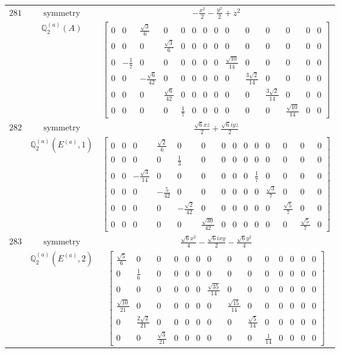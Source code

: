 \documentclass[fleqn,8pt,landscape]{jsarticle}
\begin{document}
\begin{longtable}{ccc}
$ 281 $ & $ \text{symmetry} $ & $ - \frac{x^{2}}{2} - \frac{y^{2}}{2} + z^{2} $ \\
$  $ & $ \mathbb{Q}_{2}^{(a)}(A) $ & $ \begin{bmatrix} 0 & 0 & \frac{\sqrt{3}}{6} & 0 & 0 & 0 & 0 & 0 & 0 & 0 & 0 & 0 & 0 & 0 \\ 0 & 0 & 0 & \frac{\sqrt{3}}{6} & 0 & 0 & 0 & 0 & 0 & 0 & 0 & 0 & 0 & 0 \\ 0 & - \frac{1}{7} & 0 & 0 & 0 & 0 & 0 & 0 & \frac{\sqrt{10}}{14} & 0 & 0 & 0 & 0 & 0 \\ 0 & 0 & - \frac{\sqrt{6}}{42} & 0 & 0 & 0 & 0 & 0 & 0 & \frac{3 \sqrt{2}}{14} & 0 & 0 & 0 & 0 \\ 0 & 0 & 0 & \frac{\sqrt{6}}{42} & 0 & 0 & 0 & 0 & 0 & 0 & \frac{3 \sqrt{2}}{14} & 0 & 0 & 0 \\ 0 & 0 & 0 & 0 & \frac{1}{7} & 0 & 0 & 0 & 0 & 0 & 0 & \frac{\sqrt{10}}{14} & 0 & 0 \end{bmatrix} $ \\ \hline
$ 282 $ & $ \text{symmetry} $ & $ \frac{\sqrt{6} x z}{2} + \frac{\sqrt{6} i y z}{2} $ \\
$  $ & $ \mathbb{Q}_{2}^{(a)}(E^{(a)},1) $ & $ \begin{bmatrix} 0 & 0 & 0 & \frac{\sqrt{2}}{6} & 0 & 0 & 0 & 0 & 0 & 0 & 0 & 0 & 0 & 0 \\ 0 & 0 & 0 & 0 & \frac{1}{3} & 0 & 0 & 0 & 0 & 0 & 0 & 0 & 0 & 0 \\ 0 & 0 & - \frac{\sqrt{3}}{14} & 0 & 0 & 0 & 0 & 0 & 0 & \frac{1}{7} & 0 & 0 & 0 & 0 \\ 0 & 0 & 0 & - \frac{5}{42} & 0 & 0 & 0 & 0 & 0 & 0 & \frac{\sqrt{3}}{7} & 0 & 0 & 0 \\ 0 & 0 & 0 & 0 & - \frac{\sqrt{2}}{42} & 0 & 0 & 0 & 0 & 0 & 0 & \frac{\sqrt{5}}{7} & 0 & 0 \\ 0 & 0 & 0 & 0 & 0 & \frac{\sqrt{30}}{42} & 0 & 0 & 0 & 0 & 0 & 0 & \frac{\sqrt{5}}{7} & 0 \end{bmatrix} $ \\ \hline
$ 283 $ & $ \text{symmetry} $ & $ \frac{\sqrt{6} x^{2}}{4} - \frac{\sqrt{6} i x y}{2} - \frac{\sqrt{6} y^{2}}{4} $ \\
$  $ & $ \mathbb{Q}_{2}^{(a)}(E^{(a)},2) $ & $ \begin{bmatrix} \frac{\sqrt{5}}{6} & 0 & 0 & 0 & 0 & 0 & 0 & 0 & 0 & 0 & 0 & 0 & 0 & 0 \\ 0 & \frac{1}{6} & 0 & 0 & 0 & 0 & 0 & 0 & 0 & 0 & 0 & 0 & 0 & 0 \\ 0 & 0 & 0 & 0 & 0 & 0 & \frac{\sqrt{35}}{14} & 0 & 0 & 0 & 0 & 0 & 0 & 0 \\ \frac{\sqrt{10}}{21} & 0 & 0 & 0 & 0 & 0 & 0 & \frac{\sqrt{15}}{14} & 0 & 0 & 0 & 0 & 0 & 0 \\ 0 & \frac{2 \sqrt{2}}{21} & 0 & 0 & 0 & 0 & 0 & 0 & \frac{\sqrt{5}}{14} & 0 & 0 & 0 & 0 & 0 \\ 0 & 0 & \frac{\sqrt{3}}{21} & 0 & 0 & 0 & 0 & 0 & 0 & \frac{1}{14} & 0 & 0 & 0 & 0 \end{bmatrix} $ \\ \hline

\end{longtable}
\end{document}
